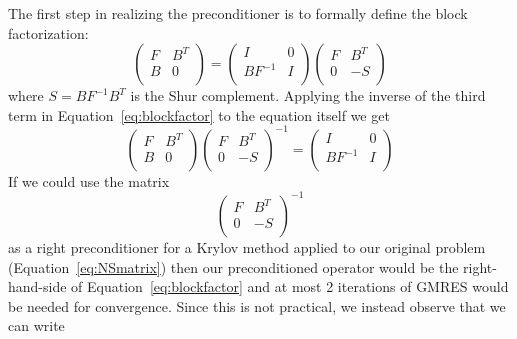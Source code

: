 \documentclass[12pt,relax]{TPA}
\begin{document}
The first step in realizing the preconditioner is to formally define
the block factorization:
\begin{equation}
\label{eq:blockfactor}
\left(\begin{array}{cc}
	F & B^T \\
	B & 0 \\
\end{array}\right)
=
\left(\begin{array}{cc}
	I & 0  \\
	BF^{-1} & I \\
\end{array}\right)
\left(\begin{array}{cc}
	F & B^T \\
	0 & -S \\
\end{array}\right)
\end{equation}
where $S = BF^{-1}B^T$ is the Shur complement.  Applying the inverse
of the third term in Equation~\ref{eq:blockfactor} to the equation
itself we get
\begin{equation}
\label{eq:blockfactor1}
\left(\begin{array}{cc}
	F & B^T \\
	B & 0 \\
\end{array}
\right)
\left(\begin{array}{cc}
	F & B^T \\
	0 & -S \\
\end{array}\right)^{-1}
=
\left(\begin{array}{cc}
	I & 0  \\
	BF^{-1} & I \\
\end{array}\right)
\end{equation}
If we could use the matrix
\begin{equation}
\label{eq:exactprecon}
\left(\begin{array}{cc}
	F & B^T \\
	0 & -S \\
\end{array}\right)^{-1}
\end{equation}
as a right preconditioner for a Krylov method applied to our 
original problem (Equation~\ref{eq:NSmatrix}) then our 
preconditioned operator would be the right-hand-side of
Equation~\ref{eq:blockfactor} and at most 2 iterations of GMRES would
be needed for convergence.  Since this is not practical, we instead
observe that we can write
\end{document}
